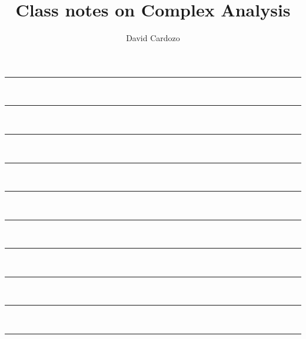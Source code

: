 \documentclass[notitlepage]{article}
\author{David Cardozo}
\title{Class notes on Complex Analysis}
\begin{document}



\noindent\rule{\textwidth}{1pt}\\[-0.1cm]


\noindent\rule{\textwidth}{1pt}\\[-0.1cm]


\noindent\rule{\textwidth}{1pt}\\[-0.1cm]
	

\noindent\rule{\textwidth}{1pt}\\[-0.1cm]



\noindent\rule{\textwidth}{1pt}\\[-0.1cm]



\noindent\rule{\textwidth}{1pt}\\[-0.1cm]


	
\noindent\rule{\textwidth}{1pt}\\[-0.1cm]




\noindent\rule{\textwidth}{1pt}\\[-0.1cm]



\noindent\rule{\textwidth}{1pt}\\[-0.1cm]





\noindent\rule{\textwidth}{1pt}\\[-0.1cm]



\end{document}
